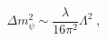 \begin{equation}
\label{eq:masscor1}
\Delta m_{\psi}^2 \sim \frac{\lambda}{16\pi^2} \Lambda^2 \;,
\end{equation}

